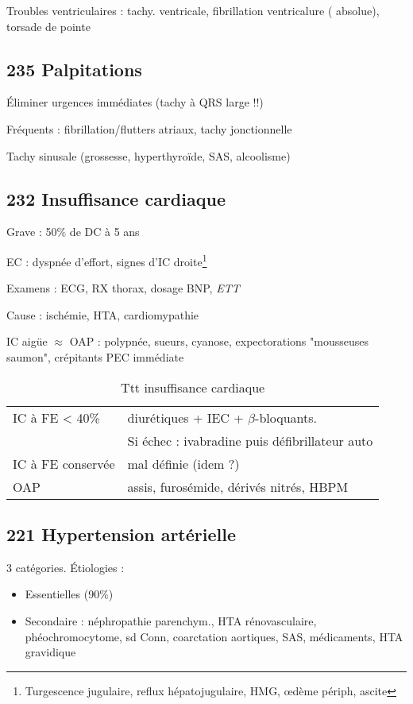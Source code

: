 \documentclass[11pt]{article}
\begin{document}
Troubles ventriculaires : tachy. ventricale, fibrillation ventricalure (
absolue), torsade de pointe
\subsection{235 Palpitations}
\label{sec:orgae01964}
Éliminer urgences immédiates (tachy à QRS large !!)

Fréquents : fibrillation/flutters atriaux, tachy jonctionnelle

Tachy sinusale (grossesse, hyperthyroïde, SAS, alcoolisme) 
\subsection{232 Insuffisance cardiaque}
\label{sec:org09d0a0a}
Grave : 50\% de DC à 5 ans

EC : dyspnée d'effort, signes d'IC droite\footnote{Turgescence jugulaire, reflux hépatojugulaire, HMG, \oe{}dème périph, ascite}

Examens : ECG, RX thorax, dosage BNP, \emph{ETT}

Cause : ischémie, HTA, cardiomypathie

IC aigüe \(\approx\) OAP : polypnée, sueurs, cyanose, expectorations "mousseuses
saumon", crépitants \thus PEC immédiate 

\begin{table}[htbp]
\caption{Ttt insuffisance cardiaque}
\centering
\begin{tabular}{ll}
IC à FE < 40\% & diurétiques + IEC + \(\beta\)-bloquants\footnotemark.\\
 & Si échec : ivabradine puis défibrillateur auto\\
IC à FE conservée & mal définie (idem ?)\\
OAP & assis, furosémide, dérivés nitrés, HBPM\\
\end{tabular}
\end{table}

\subsection{221 Hypertension artérielle}
\label{sec:orgd64fbff}
3 catégories. Étiologies :
\begin{itemize}
\item Essentielles (90\%)
\item Secondaire : néphropathie parenchym., HTA rénovasculaire, phéochromocytome, sd Conn,
coarctation aortiques, SAS, médicaments, HTA gravidique
\end{itemize}
\end{document}
